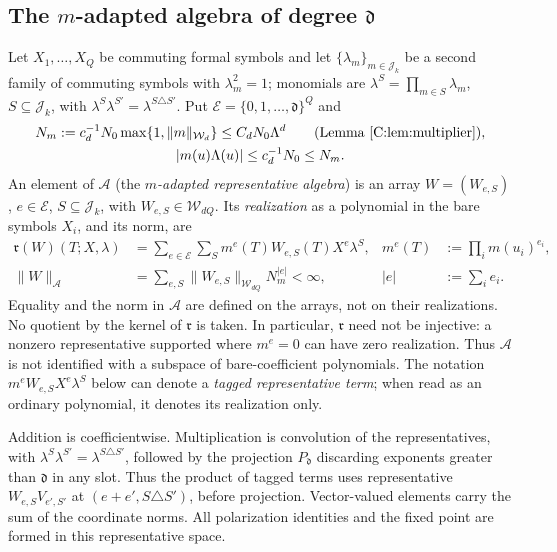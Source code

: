 \documentclass[11pt]{article}
\newcommand{\cW}{\mathcal{W}}
\newcommand{\cA}{\mathcal{A}}
\newcommand{\cE}{\mathcal{E}}
\newcommand{\cJ}{\mathcal{J}}
\newcommand{\norm}[1]{\lVert #1\rVert}
\newcommand{\abs}[1]{\lvert #1\rvert}
\newcommand{\dg}{\mathfrak{d}}
\newcommand{\realize}{\mathfrak r}
\begin{document}
\subsection{The \texorpdfstring{\(m\)}{m}-adapted algebra of degree \texorpdfstring{\(\dg\)}{d}}
Let \(X_1,\dots,X_Q\) be commuting formal symbols and let
\(\{\lambda_m\}_{m\in\cJ_k}\) be a second family of commuting symbols with
\(\lambda_m^2=1\); monomials are \(\lambda^S=\prod_{m\in S}\lambda_m\),
\(S\subseteq\cJ_k\), with \(\lambda^S\lambda^{S'}=\lambda^{S\triangle S'}\).
Put \(\cE=\{0,1,\dots,\dg\}^Q\) and
\begin{equation}
 \begin{gathered}
 N_m:=c_d^{-1}N_0\max\{1,\norm{m}_{\cW_d}\}
       \le C_dN_0\Lambda^d
       \qquad(\text{Lemma~\ref{C:lem:multiplier}}),\\
 \abs{m(u)\Lambda(u)}\le c_d^{-1}N_0\le N_m .
 \end{gathered}
 \label{C:eq:Nm}
\end{equation}
An element of \(\cA\) (the \emph{\(m\)-adapted representative algebra}) is
an array \(W=(W_{e,S})\), \(e\in\cE\), \(S\subseteq\cJ_k\), with
\(W_{e,S}\in\cW_{dQ}\).  Its \emph{realization} as a polynomial in the
bare symbols \(X_i\), and its norm, are
\begin{equation}
 \begin{aligned}
  \realize(W)(T;X,\lambda)
   &=\sum_{e\in\cE}\sum_S m^e(T)W_{e,S}(T)X^e\lambda^S,
   &m^e(T)&:=\prod_i m(u_i)^{e_i},\\
  \norm W_\cA
   &=\sum_{e,S}\norm{W_{e,S}}_{\cW_{dQ}}N_m^{\abs e}<\infty,
   &\abs e&:=\sum_i e_i .
 \end{aligned}
 \label{C:eq:A-norm}
\end{equation}
Equality and the norm in \(\cA\) are defined on the arrays, not on their
realizations.  No quotient by the kernel of \(\realize\) is taken.
In particular, \(\realize\) need not be injective: a nonzero
representative supported where \(m^e=0\) can have zero realization.
Thus \(\cA\) is not identified with a subspace of bare-coefficient
polynomials.  The notation \(m^eW_{e,S}X^e\lambda^S\) below can denote a
\emph{tagged representative term}; when read as an ordinary polynomial,
it denotes its realization only.

Addition is coefficientwise.  Multiplication is convolution of the
representatives, with \(\lambda^S\lambda^{S'}=\lambda^{S\triangle S'}\),
followed by the projection \(P_\dg\) discarding exponents greater than
\(\dg\) in any slot.  Thus the product of tagged terms uses
representative \(W_{e,S}V_{e',S'}\) at \((e+e',S\triangle S')\), before
projection.  Vector-valued elements carry the sum of the coordinate
norms.  All polarization identities and the fixed point are formed in
this representative space.
\end{document}
